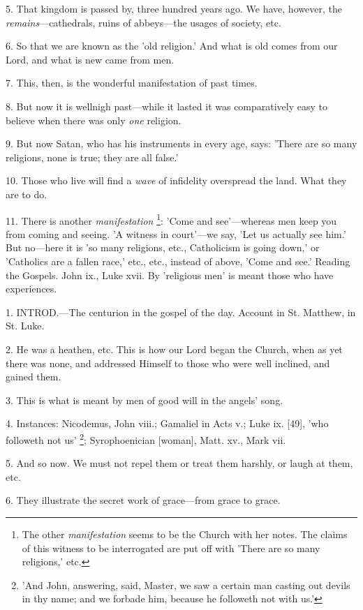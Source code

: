 5. That kingdom is passed by, three hundred years
ago. We have, however, the \emph{remains}—cathedrals, ruins of
abbeys—the usages of society, etc.

6. So that we are known as the 'old religion.'
And what is old comes from our Lord, and what is new came from men.

7. This, then, is the wonderful manifestation of
past times.

8. But now it is wellnigh past—while it lasted
it was comparatively easy to believe when there was only \emph{one}
religion.

9. But now Satan, who has his instruments in
every age, says: 'There are so many religions, none is true; they are
all false.'

10. Those who live will find a \emph{wave} of
infidelity overspread the land. What they are to do.

11. There is another \emph{manifestation} \footnote{The other \emph{manifestation}
seems to be the Church with her notes. The claims of this witness to
be interrogated are put off with 'There are so many religions,' etc.}: 'Come and see'—whereas men keep you from coming and seeing.
'A witness in court'—we say, 'Let us actually see him.' But
no—here it is 'so many religions, etc., Catholicism is going down,'
or 'Catholics are a fallen race,' etc., etc., instead of above, 'Come
and see.' Reading the Gospels. John ix., Luke xvii. By 'religious men'
is meant those who have experiences.


1. INTROD.—The
centurion in the gospel of the day. Account in St. Matthew, in St.
Luke.

2. He was a heathen, etc. This is how our Lord
began the Church, when as yet there was none, and addressed Himself to
those who were well inclined, and gained them.

3. This is what is meant by men of good will in
the angels' song.

4. Instances: Nicodemus, John viii.; Gamaliel in
Acts v.; Luke ix. [49], 'who followeth not us' \footnote{'And John, answering,
said, Master, we saw a certain man casting out devils in thy name; and
we forbade him, because he followeth not with us.'}; Syrophoenician [woman], Matt. xv., Mark vii.

5. And so now. We must not repel them or treat
them harshly, or laugh at them, etc.

6. They illustrate the secret work of
grace—from grace to grace.

